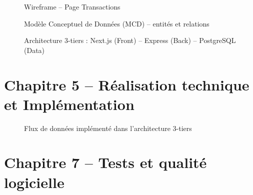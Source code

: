 \begin{figure}[H]
    \centering
    \begin{minipage}{0.48\textwidth}
        \centering
        \caption{Wireframe basse fidélité -- Dashboard}
        \label{fig:wireframe-dashboard-ann}
    \end{minipage}\hfill
    \begin{minipage}{0.48\textwidth}
        \centering
        \caption{Wireframe -- Page Transactions}
        \label{fig:wireframe-transactions-ann}
    \end{minipage}
\end{figure}

\begin{figure}[H]
    \centering
    \caption{Modèle Conceptuel de Données (MCD) -- entités et relations}
    \label{fig:mcd-ann}
\end{figure}

\begin{figure}[H]
    \centering
    \caption{Architecture 3-tiers : Next.js (Front) -- Express (Back) -- PostgreSQL (Data)}
    \label{fig:arch-3tiers-ann}
\end{figure}

\section{Chapitre 5 -- Réalisation technique et Implémentation}

\begin{figure}[H]
    \centering
    \caption{Flux de données implémenté dans l'architecture 3-tiers}
    \label{fig:arch_impl-ann}
\end{figure}

\section{Chapitre 7 -- Tests et qualité logicielle}

